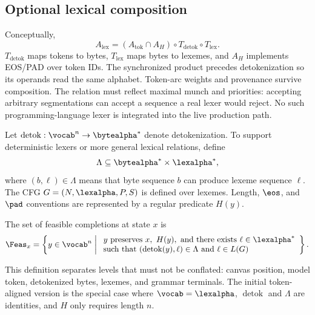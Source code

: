 \subsection{Optional lexical composition}
Conceptually,
\begin{equation}
A_{\mathrm{lex}}=(A_{\mathrm{tok}}\cap A_H)\circ T_{\mathrm{detok}}\circ T_{\mathrm{lex}}.
\end{equation}
$T_{\mathrm{detok}}$ maps tokens to bytes, $T_{\mathrm{lex}}$ maps bytes to lexemes, and $A_H$ implements EOS/PAD over token IDs. The synchronized product precedes detokenization so its operands read the same alphabet. Token-arc weights and provenance survive composition. The relation must reflect maximal munch and priorities: accepting arbitrary segmentations can accept a sequence a real lexer would reject. No such programming-language lexer is integrated into the live production path.


Let $\operatorname{detok}:\vocab^n\rightarrow\bytealpha^*$ denote detokenization. To support deterministic lexers or more general lexical relations, define
\begin{equation}
 \Lambda\subseteq\bytealpha^*\times\lexalpha^*,
\end{equation}
where $(b,\ell)\in\Lambda$ means that byte sequence $b$ can produce lexeme sequence $\ell$. The CFG $G=(N,\lexalpha,P,S)$ is defined over lexemes. Length, $\eos$, and $\pad$ conventions are represented by a regular predicate $H(y)$.

\begin{definition}
The set of feasible completions at state $x$ is
\begin{equation}
\Feas_x=\left\{y\in\vocab^n\;\middle|\;
\begin{array}{l}
y\text{ preserves }x,\ H(y),\text{ and there exists }\ell\in\lexalpha^*\\
\text{such that }(\operatorname{detok}(y),\ell)\in\Lambda
\text{ and }\ell\in L(G)
\end{array}\right\}.
\end{equation}
\end{definition}

This definition separates levels that must not be conflated: canvas position, model token, detokenized bytes, lexemes, and grammar terminals. The initial token-aligned version is the special case where $\vocab=\lexalpha$, $\operatorname{detok}$ and $\Lambda$ are identities, and $H$ only requires length $n$.
